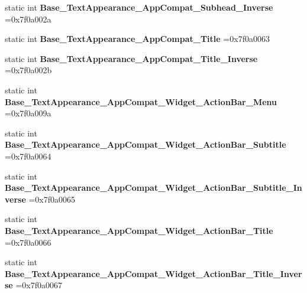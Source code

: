 \begin{DoxyCompactItemize}
static int {\bfseries Base\+\_\+\+Text\+Appearance\+\_\+\+App\+Compat\+\_\+\+Subhead\+\_\+\+Inverse} =0x7f0a002a
\item 
\mbox{\label{classandroid_1_1support_1_1design_1_1R_1_1style_a62f1b7dce23b2f50803e9e54f6cec08e}} 
static int {\bfseries Base\+\_\+\+Text\+Appearance\+\_\+\+App\+Compat\+\_\+\+Title} =0x7f0a0063
\item 
\mbox{\label{classandroid_1_1support_1_1design_1_1R_1_1style_abc91fd3ef921b51e89fe72effcb3babd}} 
static int {\bfseries Base\+\_\+\+Text\+Appearance\+\_\+\+App\+Compat\+\_\+\+Title\+\_\+\+Inverse} =0x7f0a002b
\item 
\mbox{\label{classandroid_1_1support_1_1design_1_1R_1_1style_a9962c32b4f8b07123a5f4e63661f7aab}} 
static int {\bfseries Base\+\_\+\+Text\+Appearance\+\_\+\+App\+Compat\+\_\+\+Widget\+\_\+\+Action\+Bar\+\_\+\+Menu} =0x7f0a009a
\item 
\mbox{\label{classandroid_1_1support_1_1design_1_1R_1_1style_a6a25108af4829b66750d9ec0fe084eca}} 
static int {\bfseries Base\+\_\+\+Text\+Appearance\+\_\+\+App\+Compat\+\_\+\+Widget\+\_\+\+Action\+Bar\+\_\+\+Subtitle} =0x7f0a0064
\item 
\mbox{\label{classandroid_1_1support_1_1design_1_1R_1_1style_ab55f0ea5296e1a096af76e9412f15368}} 
static int {\bfseries Base\+\_\+\+Text\+Appearance\+\_\+\+App\+Compat\+\_\+\+Widget\+\_\+\+Action\+Bar\+\_\+\+Subtitle\+\_\+\+Inverse} =0x7f0a0065
\item 
\mbox{\label{classandroid_1_1support_1_1design_1_1R_1_1style_a03e19d4d24378cbae6a0d8886f19eaa4}} 
static int {\bfseries Base\+\_\+\+Text\+Appearance\+\_\+\+App\+Compat\+\_\+\+Widget\+\_\+\+Action\+Bar\+\_\+\+Title} =0x7f0a0066
\item 
\mbox{\label{classandroid_1_1support_1_1design_1_1R_1_1style_a77126c57e4c3956531e919ecfb865085}} 
static int {\bfseries Base\+\_\+\+Text\+Appearance\+\_\+\+App\+Compat\+\_\+\+Widget\+\_\+\+Action\+Bar\+\_\+\+Title\+\_\+\+Inverse} =0x7f0a0067

\end{DoxyCompactItemize}
